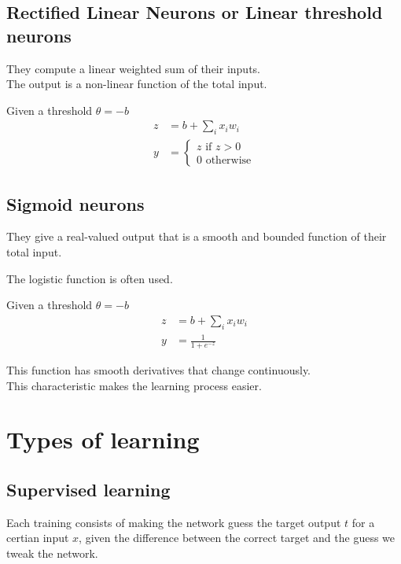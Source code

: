 \documentclass{article}
\begin{document}
\subsection{Rectified Linear Neurons or Linear threshold neurons}

They compute a linear weighted sum of their inputs. \\
The output is a non-linear function of the total input.

Given a threshold \(\theta=-b\)
\begin{align*}    
    z&=b+\sum_ix_iw_i \\
    y&=\begin{cases}
        z \text{ if } z > 0 \\
        0 \text{ otherwise}
    \end{cases}
\end{align*}


\subsection{Sigmoid neurons}

They give a real-valued output that is a smooth and bounded function of their total input.

The logistic function is often used.

Given a threshold \(\theta=-b\)
\begin{align*}    
    z&=b+\sum_ix_iw_i \\
    y&=\frac{1}{1+e^{-z}}
\end{align*}


This function has smooth derivatives that change continuously. \\
This characteristic makes the learning process easier.

\pagebreak


\section{Types of learning}

\subsection{Supervised learning}
Each training consists of making the network guess the target output \(t\) for a certian input \(x\), given the difference between the correct target and the guess we tweak the network.
\end{document}
